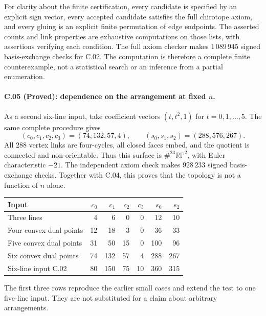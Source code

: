 For clarity about the finite certification, every candidate is
specified by an explicit sign vector, every accepted candidate
satisfies the full chirotope axiom, and every gluing is an explicit
finite permutation of edge endpoints. The asserted counts and
link properties are exhaustive computations on those lists, with
assertions verifying each condition. The full axiom checker makes
$1\,089\,945$ signed basis-exchange checks for C.02. The computation
is therefore a complete finite counterexample, not a statistical
search or an inference from a partial enumeration.

\paragraph{C.05 (Proved): dependence on the arrangement at fixed $n$.}
As a second six-line input, take coefficient vectors
$(t,t^2,1)$ for $t=0,1,\ldots,5$. The same complete procedure gives
\[
 (c_0,c_1,c_2,c_3)=(74,132,57,4),\qquad
 (s_0,s_1,s_2)=(288,576,267).
\]
All $288$ vertex links are four-cycles, all closed faces embed,
and the quotient is connected and non-orientable. Thus this
surface is $\#^{23}\mathbb{RP}^2$, with Euler characteristic $-21$.
The independent axiom check makes $928\,233$ signed basis-exchange
checks. Together with C.04, this proves that the topology is not
a function of $n$ alone.

\begin{center}
\begin{tabular}{lrrrrrr}
\hline
Input & $c_0$ & $c_1$ & $c_2$ & $c_3$ & $s_0$ & $s_2$\\
\hline
Three lines & 4 & 6 & 0 & 0 & 12 & 10\\
Four convex dual points & 12 & 18 & 3 & 0 & 36 & 33\\
Five convex dual points & 31 & 50 & 15 & 0 & 100 & 96\\
Six convex dual points & 74 & 132 & 57 & 4 & 288 & 267\\
Six-line input C.02 & 80 & 150 & 75 & 10 & 360 & 315\\
\hline
\end{tabular}
\end{center}
The first three rows reproduce the earlier small cases and extend
the test to one five-line input. They are not substituted for a
claim about arbitrary arrangements.

